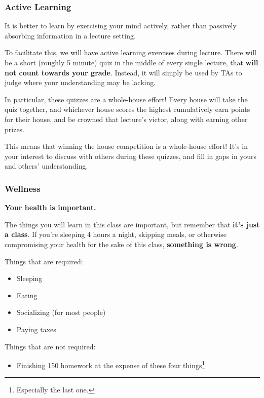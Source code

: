 \documentclass[aspectratio=169, handout]{beamer}
\begin{document}
\begin{frame}[fragile]
  \frametitle{Active Learning}

  It is better to learn by exercising your mind actively, rather than passively absorbing
  information in a lecture setting.

  \pause
  \vspace{\fill}

  To facilitate this, we will have active learning exercises during lecture. There will be
  a short (roughly 5 minute) quiz in the middle of every single lecture, that \textbf{will not
  count towards your grade}. Instead, it will simply be used by TAs to judge where your
  understanding may be lacking.

  \pause
  \vspace{\fill}

  In particular, these quizzes are a whole-house effort! Every house will take the quiz
  together, and whichever house scores the highest cumulatively earn points for their house,
  and be crowned that lecture's victor, along with earning other prizes.

  \pause
  \vspace{\fill}

  This means that winning the house competition is a whole-house effort! It's in your interest
  to discuss with others during these quizzes, and fill in gaps in yours and others'
  understanding.
\end{frame}

\begin{frame}[fragile]
  \frametitle{Wellness}

  \textbf{Your health is important.}

  \pause
  \vspace{\fill}

  The things you will learn in this class are important, but remember that
  \textbf{it's just a class}. If you're sleeping 4 hours a night, skipping meals,
  or otherwise compromising your health for the sake of this class, \textbf{something
  is wrong}.

  \pause
  \vspace{\fill}

  Things that are required:
  \begin{itemize}
    \item Sleeping \pause
    \item Eating \pause
    \item Socializing (for most people) \pause
    \item Paying taxes
  \end{itemize}

  \pause
  \vspace{\fill}

  Things that are not required:
  \begin{itemize}
    \item Finishing 150 homework at the expense of these four things\footnote{Especially the last one.}
  \end{itemize}
\end{frame}
\end{document}

